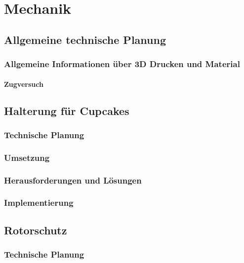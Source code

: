 \chapter{Mechanik}

\renewcommand{\kapitelautor}{Autor: Alexander Punz}

\section{Allgemeine technische Planung}
	
	\subsection{Allgemeine Informationen über 3D Drucken und Material}

		\subsubsection{Zugversuch}

\section{Halterung für Cupcakes}

	\subsection{Technische Planung}

	\subsection{Umsetzung}

	\subsection{Herausforderungen und Lösungen}

	\subsection{Implementierung}

\section{Rotorschutz}

	\subsection{Technische Planung}

